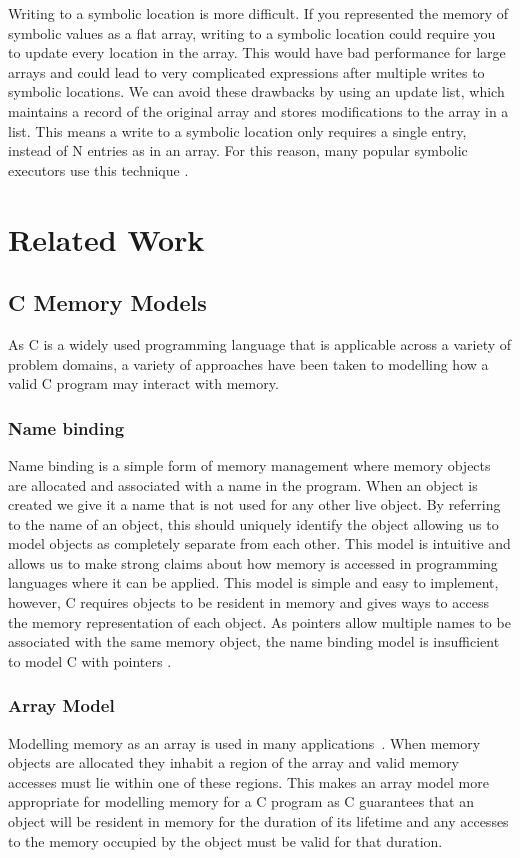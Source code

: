 \documentclass[12pt,twoside]{report}
\begin{document}
Writing to a symbolic location is more difficult. If you represented the memory of symbolic values as a flat array, writing to a symbolic location could require you to update every location in the array. This would have bad performance for large arrays and could lead to very complicated expressions after multiple writes to symbolic locations. We can avoid these drawbacks by using an update list, which maintains a record of the original array and stores modifications to the array in a list. This means a write to a symbolic location only requires a single entry, instead of N entries as in an array. For this reason, many popular symbolic executors use this technique \cite{cadar2008klee, cadar2008exe}.


\chapter{Related Work}
\section{C Memory Models}
As C is a widely used programming language that is applicable across a variety of problem domains, a variety of approaches have been taken to modelling how a valid C program may interact with memory.
\subsection{Name binding}
Name binding is a simple form of memory management where memory objects are allocated and associated with a name in the program. When an object is created we give it a name that is not used for any other live object. By referring to the name of an object, this should uniquely identify the object allowing us to model objects as completely separate from each other. This model is intuitive and allows us to make strong claims about how memory is accessed in programming languages where it can be applied.
This model is simple and easy to implement, however, C requires objects to be resident in memory and gives ways to access the memory representation of each object. As pointers allow multiple names to be associated with the same memory object, the name binding model is insufficient to model C with pointers \cite{xu2010memory}.

\subsection{Array Model}
Modelling memory as an array is used in many applications~\cite{cadar2008klee,cadar2008exe,leroy2008formal,poeplau2020symbolic}. When memory objects are allocated they inhabit a region of the array and valid memory accesses must lie within one of these regions. This makes an array model more appropriate for modelling memory for a C program as C guarantees that an object will be resident in memory for the duration of its lifetime and any accesses to the memory occupied by the object must be valid for that duration.
\end{document}

